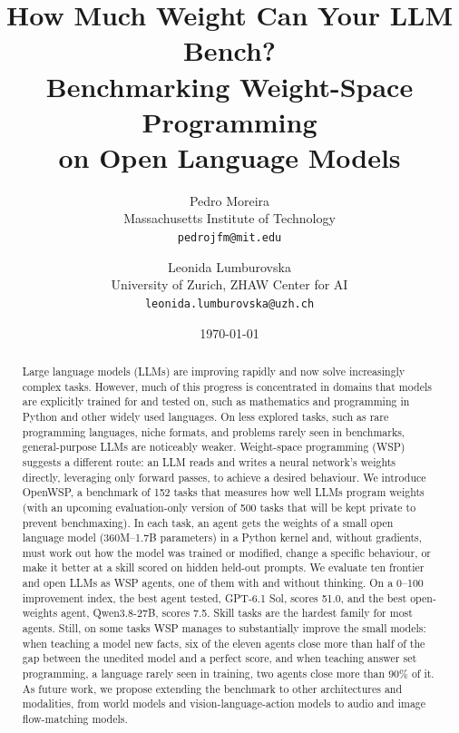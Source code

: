 \documentclass[11pt]{article}
\title{How Much Weight Can Your LLM Bench?\\
  Benchmarking Weight-Space Programming\\ on Open Language Models}
\author{
  Pedro Moreira \\ Massachusetts Institute of Technology \\ \texttt{pedrojfm@mit.edu}
  \and
  Leonida Lumburovska \\ University of Zurich, ZHAW Center for AI \\ \texttt{leonida.lumburovska@uzh.ch}
}
\date{\today}
\newcommand{\bench}{OpenWSP\xspace}
\begin{document}
\maketitle

\begin{abstract}
Large language models (LLMs) are improving rapidly and now solve increasingly complex tasks.
However, much of this progress is concentrated in domains that models are explicitly trained
for and tested on, such as mathematics and programming in Python and other widely used
languages. On
less explored tasks, such as rare programming languages, niche formats, and problems rarely
seen in benchmarks, general-purpose LLMs are noticeably weaker. Weight-space programming
(WSP) suggests a different route: an LLM reads
and writes a neural network's weights directly, leveraging only forward passes, to achieve a desired behaviour. We introduce \bench, a
benchmark of 152 tasks that measures how well LLMs program weights (with an upcoming evaluation-only version of 500 tasks that will be kept private to prevent benchmaxing).
In each task, an agent gets the weights of a small open language model (360M--1.7B parameters) in a Python kernel
and, without gradients, must work out how the model was trained or modified, change a
specific behaviour, or make it better at a skill scored on hidden held-out prompts. We
evaluate ten frontier and open LLMs as WSP agents, one of them with and without thinking. On
a 0--100 improvement index, the best
agent tested, GPT-6.1 Sol, scores 51.0, and the best open-weights agent, Qwen3.8-27B, scores 7.5.
Skill tasks are the hardest family for most agents. Still, on some tasks WSP manages to
substantially improve the small models: when teaching a model new facts, six of the eleven
agents close more than half of the gap between the unedited model and a perfect score, and
when teaching answer set programming, a language rarely seen in training, two agents close
more than 90\% of it. As future work, we propose extending the benchmark to other architectures and modalities, from
world models and vision-language-action models to audio and image flow-matching models.
\end{abstract}

\end{document}
